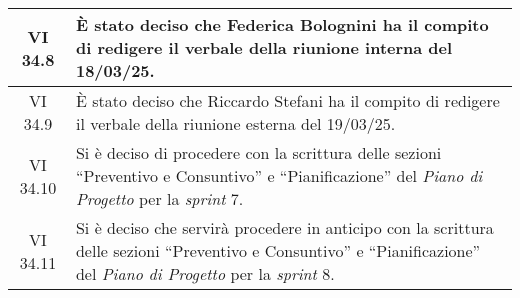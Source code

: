 \begin{table}[htbp]
\begin{tabular}{|c|p{}|}
        \hline
        VI 34.8 & È stato deciso che Federica Bolognini ha il compito di redigere il verbale della riunione interna del 18/03/25.\\
        \hline
        VI 34.9 & È stato deciso che Riccardo Stefani ha il compito di redigere il verbale della riunione esterna del 19/03/25.\\
        \hline
        VI 34.10 & Si è deciso di procedere con la scrittura delle sezioni “Preventivo e Consuntivo” e “Pianificazione” del \emph{Piano di Progetto} per la \emph{sprint} 7.\\
        \hline
        VI 34.11 & Si è deciso che servirà procedere in anticipo con la scrittura delle sezioni “Preventivo e Consuntivo” e “Pianificazione” del \emph{Piano di Progetto} per la \emph{sprint} 8.\\
        \hline
    \end{tabular}
\end{table}


